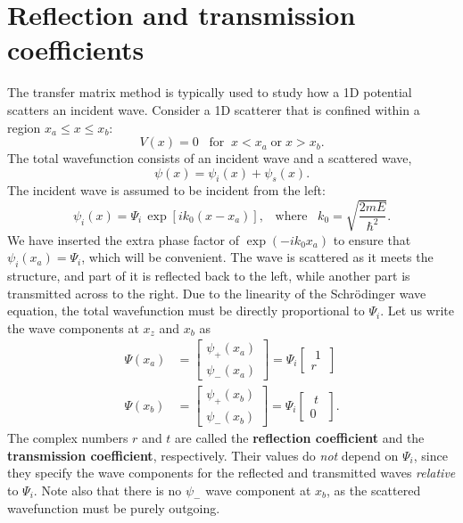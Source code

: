 \documentclass[prx,12pt]{revtex4-2}
\begin{document}
\section{Reflection and transmission coefficients}

The transfer matrix method is typically used to study how a 1D
potential scatters an incident wave.  Consider a 1D scatterer that is
confined within a region $x_a \le x \le x_b$:
\begin{equation}
  V(x) = 0 \;\;\;\mathrm{for}\;\;x < x_a \;\textrm{or}\; x > x_b.
\end{equation}
The total wavefunction consists of an incident wave and a scattered
wave,
\begin{equation}
  \psi(x) = \psi_i(x) + \psi_s(x).
\end{equation}
The incident wave is assumed to be incident from the left:
\begin{equation}
  \psi_i(x) = \Psi_i \, \exp[ik_0(x-x_a)], \;\;\;\textrm{where}\;\;\; k_0 = \sqrt{\frac{2mE}{\hbar^2}}.
\end{equation}
We have inserted the extra phase factor of $\exp(-ik_0x_a)$ to ensure
that $\psi_i(x_a) = \Psi_i$, which will be convenient.  The wave is
scattered as it meets the structure, and part of it is reflected back
to the left, while another part is transmitted across to the right.
Due to the linearity of the Schr\"odinger wave equation, the total
wavefunction must be directly proportional to $\Psi_i$.  Let us
write the wave components at $x_z$ and $x_b$ as
\begin{align}
  \Psi(x_a) &= \begin{bmatrix}\psi_+(x_a) \\ \psi_-(x_a) \end{bmatrix} = \Psi_i \begin{bmatrix}\,\,1\, \\ r \end{bmatrix} \\ \Psi(x_b) &= \begin{bmatrix}\psi_+(x_b) \\ \psi_-(x_b) \end{bmatrix} = \Psi_i \begin{bmatrix}\,\,t\,\, \\ 0 \end{bmatrix}.
\end{align}
The complex numbers $r$ and $t$ are called the \textbf{reflection
  coefficient} and the \textbf{transmission coefficient},
respectively.  Their values do \textit{not} depend on $\Psi_i$, since
they specify the wave components for the reflected and transmitted
waves \textit{relative} to $\Psi_i$.  Note also that there is no
$\psi_-$ wave component at $x_b$, as the scattered wavefunction
must be purely outgoing.
\end{document}
